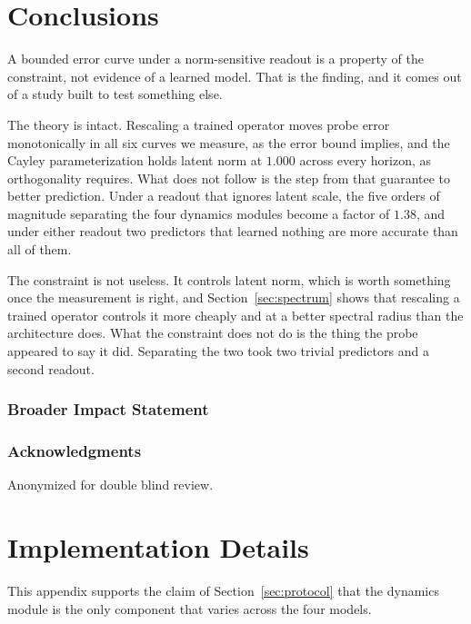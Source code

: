 \documentclass[10pt]{article} %
\begin{document}
\section{Conclusions}
\label{sec:conclusion}
A bounded error curve under a norm-sensitive readout is a property of the constraint, not evidence of a learned model. That is the finding, and it comes out of a study built to test something else.

The theory is intact. Rescaling a trained operator moves probe error monotonically in all six curves we measure, as the error bound implies, and the Cayley parameterization holds latent norm at $1.000$ across every horizon, as orthogonality requires. What does not follow is the step from that guarantee to better prediction. Under a readout that ignores latent scale, the five orders of magnitude separating the four dynamics modules become a factor of $1.38$, and under either readout two predictors that learned nothing are more accurate than all of them.

The constraint is not useless. It controls latent norm, which is worth something once the measurement is right, and Section~\ref{sec:spectrum} shows that rescaling a trained operator controls it more cheaply and at a better spectral radius than the architecture does. What the constraint does not do is the thing the probe appeared to say it did. Separating the two took two trivial predictors and a second readout.

\subsubsection*{Broader Impact Statement}

\subsubsection*{Acknowledgments}
Anonymized for double blind review.




\appendix

\section{Implementation Details}
\label{app:impl}
This appendix supports the claim of Section~\ref{sec:protocol} that the dynamics module is the only component that varies across the four models.
\end{document}
